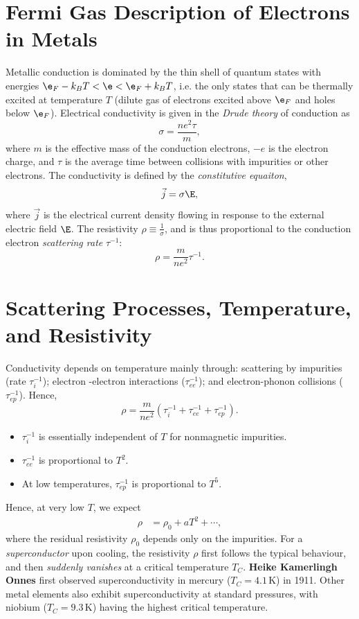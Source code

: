 \documentclass[qo.tex]{subfiles}
\begin{document}
\section{Fermi Gas Description of Electrons in Metals}
Metallic conduction is dominated by the thin shell of quantum states with energies $\e_F-k_BT<\e<\e_F+k_BT$, i.e. the only states that can be thermally excited at temperature $T$ (dilute gas of electrons excited above $\e_F$ and holes below $\e_F$).
Electrical conductivity is given in the \emph{Drude theory} of conduction as 
\begin{equation}
    \sigma=\frac{ne^2\tau}{m},
\end{equation}
where $m$ is the effective mass of the conduction electrons, $-e$ is the electron charge, and $\tau$ is the average time between collisions with impurities or other electrons. 
The conductivity is defined by the \emph{constitutive equaiton},
\begin{equation}
    \vec{j}=\sigma\E,
\end{equation}
where $\vec{j}$ is the electrical current density flowing in response to the external electric field $\E$.
The resistivity $\rho\equiv\frac{1}{\sigma}$, and is thus proportional to the conduction electron \emph{scattering rate} $\tau^{-1}$:
\begin{equation}
    \rho = \frac{m}{ne^2}\tau^{-1}.
\end{equation}

\section{Scattering Processes, Temperature, and Resistivity}
Conductivity depends on temperature mainly through: scattering by impurities (rate $\tau_i^{-1}$); electron -electron interactions ($\tau_{ee}^{-1}$); and electron-phonon collisions ($\tau_{ep}^{-1}$).
Hence,
\begin{equation}
    \rho = \frac{m}{ne^2}\left(\tau_i^{-1}+\tau_{ee}^{-1}+\tau_{ep}^{-1}\right).
\end{equation}
\begin{itemize}
    \item $\tau_i^{-1}$ is essentially independent of $T$ for nonmagnetic impurities.
    \item $\tau_{ee}^{-1}$ is proportional to $T^2$.
    \item At low temperatures, $\tau_{ep}^{-1}$ is proportional to $T^5$.
\end{itemize}
Hence, at very low $T$, we expect
\begin{align}
    \rho &= \rho_0 + aT^2 + \cdots,
\end{align}
where the residual resistivity $\rho_0$ depends only on the impurities. 
For a \emph{superconductor} upon cooling, the resistivity $\rho$ first follows the typical behaviour, and then \emph{suddenly vanishes} at a critical temperature $T_C$.
\textbf{Heike Kamerlingh Onnes} first observed superconductivity in mercury ($T_C=4.1\,$K) in 1911.
Other metal elements also exhibit superconductivity at standard pressures, with niobium ($T_C=9.3\,$K) having the highest critical temperature.
\end{document}
